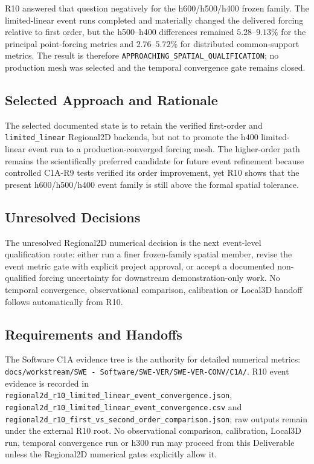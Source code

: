 R10 answered that question negatively for the h600/h500/h400 frozen
family. The limited-linear event runs completed and materially changed
the delivered forcing relative to first order, but the h500--h400
differences remained $5.28$--$9.13\%$ for the principal point-forcing
metrics and $2.76$--$5.72\%$ for distributed common-support metrics.
The result is therefore
\texttt{APPROACHING\_SPATIAL\_QUALIFICATION}; no production mesh was
selected and the temporal convergence gate remains closed.

\subsection{Selected Approach and Rationale}
\label{sec:res-ver-cnv-selected-approach}

The selected documented state is to retain the verified first-order and
\texttt{limited\_linear} Regional2D backends, but not to promote the
h400 limited-linear event run to a production-converged forcing mesh.
The higher-order path remains the scientifically preferred candidate for
future event refinement because controlled C1A-R9 tests verified its
order improvement, yet R10 shows that the present h600/h500/h400 event
family is still above the formal spatial tolerance.

\subsection{Unresolved Decisions}
\label{sec:res-ver-cnv-unresolved-decisions}

The unresolved Regional2D numerical decision is the next event-level
qualification route: either run a finer frozen-family spatial member,
revise the event metric gate with explicit project approval, or accept a
documented non-qualified forcing uncertainty for downstream
demonstration-only work. No temporal convergence, observational
comparison, calibration or Local3D handoff follows automatically from
R10.

\subsection{Requirements and Handoffs}
\label{sec:res-ver-cnv-requirements}

The Software C1A evidence tree is the authority for detailed numerical
metrics:
\texttt{docs/workstream/SWE - Software/SWE-VER/SWE-VER-CONV/C1A/}.
R10 event evidence is recorded in
\texttt{regional2d\_r10\_limited\_linear\_event\_convergence.json},
\texttt{regional2d\_r10\_limited\_linear\_event\_convergence.csv} and
\texttt{regional2d\_r10\_first\_vs\_second\_order\_comparison.json};
raw outputs remain under the external R10 root. No observational
comparison, calibration, Local3D run, temporal convergence run or h300
run may proceed from this Deliverable unless the Regional2D numerical
gates explicitly allow it.

